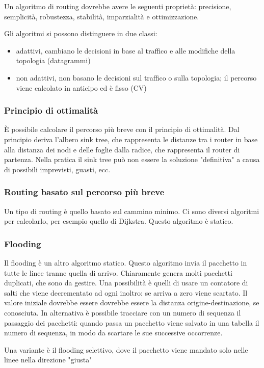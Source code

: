 Un algoritmo di routing dovrebbe avere le seguenti proprietà:
precisione, semplicità, robustezza, stabilità, imparzialità e ottimizzazione.

Gli algoritmi si possono distinguere in due classi:
\begin{itemize}
\item adattivi, cambiano le decisioni in base al traffico e alle modifiche della topologia (datagrammi)
\item non adattivi, non basano le decisioni sul traffico o sulla topologia; il percorso viene calcolato in anticipo ed è fisso (CV)
\end{itemize}

\subsubsection{Principio di ottimalità}
\`E possibile calcolare il percorso più breve con il principio di ottimalità.
Dal principio deriva l'albero sink tree, che rappresenta le distanze tra i router in base alla distanza dei nodi e delle foglie dalla radice, che rappresenta il router di partenza.
Nella pratica il sink tree può non essere la soluzione "definitiva" a causa di possibili imprevisti, guasti, ecc.

\subsubsection{Routing basato sul percorso più breve}
Un tipo di routing è quello basato sul cammino minimo.
Ci sono diversi algoritmi per calcolarlo, per esempio quello di Dijkstra.
Questo algoritmo è statico.

\subsubsection{Flooding}
Il flooding è un altro algoritmo statico.
Questo algoritmo invia il pacchetto in tutte le linee tranne quella di arrivo.
Chiaramente genera molti pacchetti duplicati, che sono da gestire.
Una possibilità è quelli di usare un contatore di salti che viene decrementato ad ogni inoltro: se arriva a zero viene scartato.
Il valore iniziale dovrebbe essere dovrebbe essere la distanza origine-destinazione, se conosciuta.
In alternativa è possibile tracciare con un numero di sequenza il passaggio dei pacchetti: quando passa un pacchetto viene salvato in una tabella il numero di sequenza, in modo da scartare le sue successive occorrenze.

Una variante è il flooding selettivo, dove il pacchetto viene mandato solo nelle linee nella direzione "giusta"

